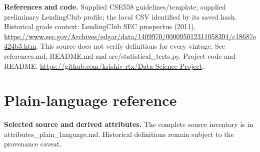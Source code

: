 \documentclass[10pt,a4paper,twocolumn]{article}
\begin{document}
\textbf{References and code.} Supplied CSE558 guidelines/template; supplied preliminary LendingClub profile; the local CSV identified by its saved hash. Historical grade context: LendingClub SEC prospectus (2011), \url{https://www.sec.gov/Archives/edgar/data/1409970/000095012311058394/c18687e424b3.htm}. This source does not verify definitions for every vintage. See references.md, README.md and src/statistical\_tests.py. Project code and README: \url{https://github.com/krishiv-rtx/Data-Science-Project}.
\clearpage\onecolumn\section{Plain-language reference}\small
\textbf{Selected source and derived attributes.} The complete source inventory is in attributes\_plain\_language.md. Historical definitions remain subject to the provenance caveat.
\end{document}
